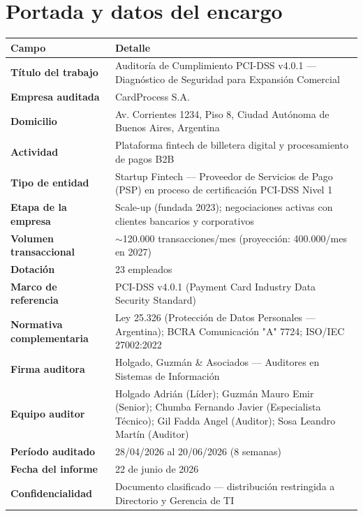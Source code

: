 \documentclass[11pt,a4paper]{article}
\begin{document}
\clearpage

\section{Portada y datos del encargo}

\begin{tabularx}{\textwidth}{P{5cm}L}
\toprule
\textbf{Campo} & \textbf{Detalle} \\
\midrule
\textbf{Título del trabajo} & Auditoría de Cumplimiento PCI-DSS v4.0.1 — Diagnóstico de Seguridad para Expansión Comercial \\
\textbf{Empresa auditada} & CardProcess S.A. \\
\textbf{Domicilio} & Av. Corrientes 1234, Piso 8, Ciudad Autónoma de Buenos Aires, Argentina \\
\textbf{Actividad} & Plataforma fintech de billetera digital y procesamiento de pagos B2B \\
\textbf{Tipo de entidad} & Startup Fintech — Proveedor de Servicios de Pago (PSP) en proceso de certificación PCI-DSS Nivel 1 \\
\textbf{Etapa de la empresa} & Scale-up (fundada 2023); negociaciones activas con clientes bancarios y corporativos \\
\textbf{Volumen transaccional} & $\sim$120.000 transacciones/mes (proyección: 400.000/mes en 2027) \\
\textbf{Dotación} & 23 empleados \\
\textbf{Marco de referencia} & PCI-DSS v4.0.1 (Payment Card Industry Data Security Standard) \\
\textbf{Normativa complementaria} & Ley 25.326 (Protección de Datos Personales — Argentina); BCRA Comunicación "A" 7724; ISO/IEC 27002:2022 \\
\textbf{Firma auditora} & Holgado, Guzmán \& Asociados — Auditores en Sistemas de Información \\
\textbf{Equipo auditor} & Holgado Adrián (Líder); Guzmán Mauro Emir (Senior); Chumba Fernando Javier (Especialista Técnico); Gil Fadda Angel (Auditor); Sosa Leandro Martín (Auditor) \\
\textbf{Período auditado} & 28/04/2026 al 20/06/2026 (8 semanas) \\
\textbf{Fecha del informe} & 22 de junio de 2026 \\
\textbf{Confidencialidad} & Documento clasificado — distribución restringida a Directorio y Gerencia de TI \\
\bottomrule
\end{tabularx}
\end{document}
